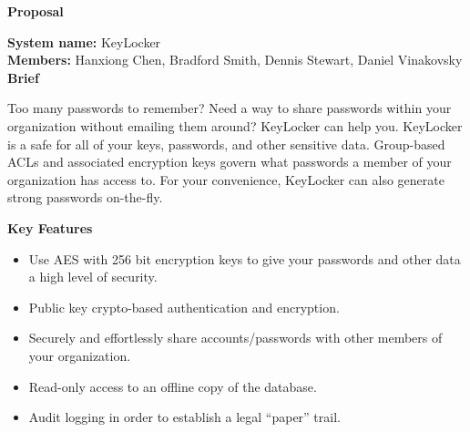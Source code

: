 \documentclass[11pt, letterpaper]{article}
\newcommand{\ProposalSection}[1]
{\noindent\textbf{#1}}
\begin{document}
\centerline{\textbf{Proposal}}
\smallskip
\noindent\textbf{System name: }KeyLocker\\
\noindent\textbf{Members: }Hanxiong Chen, Bradford Smith, Dennis Stewart, Daniel Vinakovsky\\

\ProposalSection{Brief}

\noindent
Too many passwords to remember? Need a way to share passwords within your organization without emailing them around? KeyLocker can help you. KeyLocker is a safe for all of your keys, passwords, and other sensitive data. Group-based ACLs and associated encryption keys govern what passwords a member of your organization has access to. For your convenience, KeyLocker can also generate strong passwords on-the-fly.
\smallskip

\ProposalSection{Key Features}
\begin{itemize} \itemsep1pt \parskip0pt 
\item Use AES with 256 bit encryption keys to give your passwords and other data a high level of security.
\item Public key crypto-based authentication and encryption.
\item Securely and effortlessly share accounts/passwords with other members of your organization.
\item Read-only access to an offline copy of the database.
\item Audit logging in order to establish a legal “paper” trail.
\end{itemize}
\end{document}
